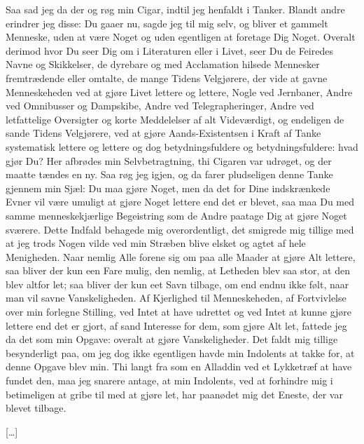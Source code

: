\documentclass[12pt,a4paper]{article}
\begin{document}
Saa sad jeg da der og røg min Cigar, indtil jeg henfaldt i Tanker. Blandt andre erindrer jeg disse: Du gaaer nu, sagde jeg til mig selv, og bliver et gammelt Menneske, uden at være Noget og uden egentligen at foretage Dig Noget. Overalt derimod hvor Du seer Dig om i Literaturen eller i Livet, seer Du de Feiredes Navne og Skikkelser, de dyrebare og med Acclamation hilsede Mennesker fremtrædende eller omtalte, de mange Tidens Velgjørere, der vide at gavne Menneskeheden ved at gjøre Livet lettere og lettere, Nogle ved Jernbaner, Andre ved Omnibusser og Dampskibe, Andre ved Telegrapheringer, Andre ved letfattelige Oversigter og korte Meddelelser af alt Videværdigt, og endeligen de sande Tidens Velgjørere, ved at gjøre Aands-Existentsen i Kraft af Tanke systematisk lettere og lettere og dog betydningsfuldere og betydningsfuldere: hvad gjør Du? Her afbrødes min Selvbetragtning, thi Cigaren var udrøget, og der maatte tændes en ny. Saa røg jeg igjen, og da farer pludseligen denne Tanke gjennem min Sjæl: Du maa gjøre Noget, men da det for Dine indskrænkede Evner vil være umuligt at gjøre Noget lettere end det er blevet, saa maa Du med samme menneskekjærlige Begeistring som de Andre paatage Dig at gjøre Noget sværere. Dette Indfald behagede mig overordentligt, det smigrede mig tillige med at jeg trods Nogen vilde ved min Stræben blive elsket og agtet af hele Menigheden. Naar nemlig Alle forene sig om paa alle Maader at gjøre Alt lettere, saa bliver der kun een Fare mulig, den nemlig, at Letheden blev saa stor, at den blev altfor let; saa bliver der kun eet Savn tilbage, om end endnu ikke følt, naar man vil savne Vanskeligheden. Af Kjerlighed til Menneskeheden, af Fortvivlelse over min forlegne Stilling, ved Intet at have udrettet og ved Intet at kunne gjøre lettere end det er gjort, af sand Interesse for dem, som gjøre Alt let, fattede jeg da det som min Opgave: overalt at gjøre Vanskeligheder. Det faldt mig tillige besynderligt paa, om jeg dog ikke egentligen havde min Indolents at takke for, at denne Opgave blev min. Thi langt fra som en Alladdin ved et Lykketræf at have fundet den, maa jeg snarere antage, at min Indolents, ved at forhindre mig i betimeligen at gribe til med at gjøre let, har paanødet mig det Eneste, der var blevet tilbage.

[…]
\end{document}
